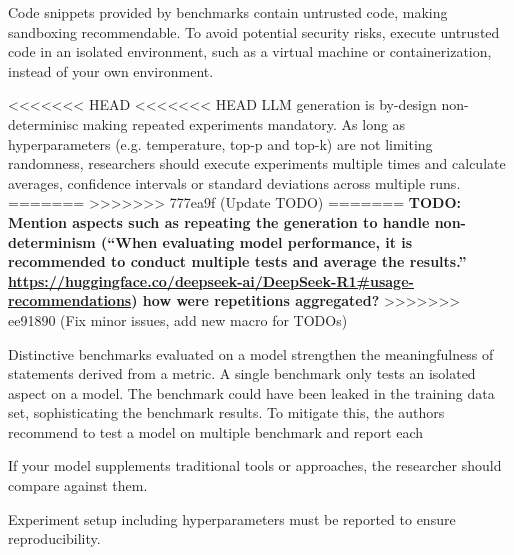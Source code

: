 \documentclass[11pt]{article}
\begin{document}
Code snippets provided by benchmarks contain untrusted code, making sandboxing recommendable.
To avoid potential security risks, execute untrusted code in an isolated environment, such as a virtual machine or containerization, instead of your own environment.

<<<<<<< HEAD
<<<<<<< HEAD
LLM generation is by-design non-determinisc making repeated experiments mandatory. %
As long as hyperparameters (e.g. temperature, top-p and top-k) are not limiting randomness, researchers should execute experiments multiple times and calculate averages, confidence intervals or standard deviations across multiple runs.
=======
>>>>>>> 777ea9f (Update TODO)
=======
\textbf{TODO: Mention aspects such as repeating the generation to handle non-determinism (``When evaluating model performance, it is recommended to conduct multiple tests and average the results.''  \url{https://huggingface.co/deepseek-ai/DeepSeek-R1\#usage-recommendations}) how were repetitions aggregated?}
>>>>>>> ee91890 (Fix minor issues, add new macro for TODOs)

Distinctive benchmarks evaluated on a model strengthen the meaningfulness of statements derived from a metric.
A single benchmark only tests an isolated aspect on a model.
The benchmark could have been leaked in the training data set, sophisticating the benchmark results.
To mitigate this, the authors recommend to test a model on multiple benchmark and report each

If your model supplements traditional tools or approaches, the researcher should compare against them.



Experiment setup including hyperparameters must be reported to ensure reproducibility.
\end{document}
